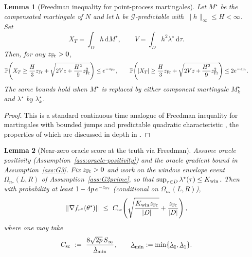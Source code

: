 \documentclass{statsoc}
\newtheorem{lemma}[lemma]{Lemma}
\newcommand{\bbP}{\mathbb{P}}
\newcommand{\dd}{\mathrm{d}}
\newcommand{\1}{\mathbbm{1}}
\begin{document}
\begin{lemma}[Freedman inequality for point-process martingales]\label{lem:Freedman}
Let $M^\star$ be the compensated martingale of $N$ and let $h$ be $\mathcal G$-predictable with $\|h\|_\infty\le H<\infty$. Set
\[
X_T=\int_D h\,\dd M^\star,\qquad
V=\int_D h^2 \lambda^\star\,\dd\tau.
\]
Then, for any $z_{\rm Fr}>0$,
\[
\bbP\!\left(X_T \ge \frac{H}{3} z_{\rm Fr} + \sqrt{ 2Vz + \frac{H^2}{9}z_{\rm Fr}^2 }\right)\le e^{-z_{\rm Fr}},\qquad
\bbP\!\left(|X_T| \ge \frac{H}{3} z_{\rm Fr} + \sqrt{ 2Vz + \frac{H^2}{9}z_{\rm Fr}^2 }\right)\le 2e^{-z_{\rm Fr}}.
\]
The same bounds hold when $M^\star$ is replaced by either component martingale $M_k^\star$ and $\lambda^\star$ by $\lambda_k^\star$.
\end{lemma}

\begin{proof}
This is a standard continuous time analogue of Freedman inequality for martingales with bounded jumps and predictable quadratic characteristic \citep{freedman1975tail}, the properties of which are discussed in depth in \citet{DZHAPARIDZE2001109}.
\end{proof}

\begin{lemma}[Near-zero oracle score at the truth via Freedman]\label{lem:score-nearzero}
Assume oracle positivity (Assumption~\ref{ass:oracle-positivity}) and the oracle gradient bound in
Assumption~\ref{ass:G3}. Fix $z_{\rm Fr}>0$ and work on the window envelope event
$\Omega_{n_*}(L,R)$ of Assumption~\ref{ass:G2prime}, so that $\sup_{\tau\in D}\lambda^\star(\tau)\le K_{\rm win}$.
Then with probability at least $1-4p\,e^{-z_{\rm Fr}}$ (conditional on $\Omega_{n_*}(L,R)$),
\[
\|\nabla f_{r^\star}(\theta^\star)\|
\ \le\ C_{\rm sc}\!\left(\sqrt{\frac{K_{\rm win} z_{\rm Fr}}{|D|}} + \frac{z_{\rm Fr}}{|D|}\right),
\]
where one may take
\[
C_{\rm sc}\ :=\ \frac{8\sqrt{2p}\,S_\infty}{\underline\lambda_{\min}},
\qquad
\underline\lambda_{\min}:=\min\{\underline\lambda_0,\underline\lambda_1\}.
\]
\end{lemma}
\end{document}
